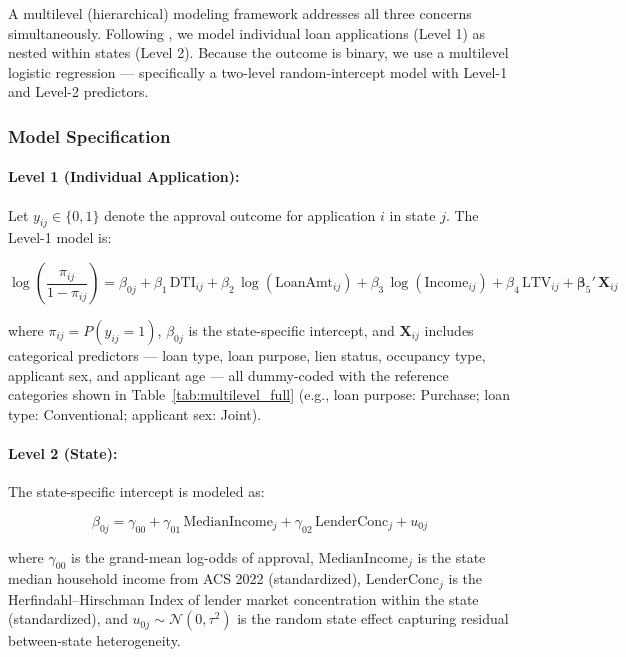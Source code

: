 \documentclass[12pt,letterpaper]{article}
\begin{document}
A multilevel (hierarchical) modeling framework addresses all three concerns simultaneously.
Following \citet{raudenbush2002}, we model individual loan applications (Level 1) as nested
within states (Level 2). Because the outcome is binary, we use a multilevel logistic regression
--- specifically a two-level random-intercept model with Level-1 and Level-2 predictors.

\subsubsection{Model Specification}

\paragraph{Level 1 (Individual Application):}
Let $y_{ij} \in \{0,1\}$ denote the approval outcome for application $i$ in state $j$.
The Level-1 model is:

\begin{equation}
  \log\!\left(\frac{\pi_{ij}}{1-\pi_{ij}}\right)
  = \beta_{0j} + \beta_1\,\text{DTI}_{ij} + \beta_2\,\log(\text{LoanAmt}_{ij})
    + \beta_3\,\log(\text{Income}_{ij}) + \beta_4\,\text{LTV}_{ij}
    + \boldsymbol{\beta}_5'\,\mathbf{X}_{ij}
  \label{eq:level1}
\end{equation}

where $\pi_{ij} = P(y_{ij}=1)$, $\beta_{0j}$ is the state-specific intercept,
and $\mathbf{X}_{ij}$ includes categorical predictors --- loan type, loan purpose, lien status,
occupancy type, applicant sex, and applicant age --- all dummy-coded with the reference
categories shown in Table~\ref{tab:multilevel_full} (e.g., loan purpose: Purchase; loan type:
Conventional; applicant sex: Joint).

\paragraph{Level 2 (State):}
The state-specific intercept is modeled as:

\begin{equation}
  \beta_{0j} = \gamma_{00} + \gamma_{01}\,\text{MedianIncome}_{j}
               + \gamma_{02}\,\text{LenderConc}_{j} + u_{0j}
  \label{eq:level2}
\end{equation}

where $\gamma_{00}$ is the grand-mean log-odds of approval,
$\text{MedianIncome}_{j}$ is the state median household income from ACS 2022 (standardized),
$\text{LenderConc}_{j}$ is the Herfindahl--Hirschman Index of lender market concentration
within the state (standardized), and $u_{0j} \sim \mathcal{N}(0, \tau^2)$ is the
random state effect capturing residual between-state heterogeneity.
\end{document}
